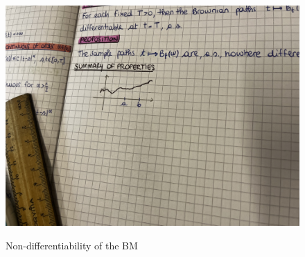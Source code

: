 \begin{figure}
    \begin{center}
    \includegraphics[width=14cm]{IMG_9589.jpeg}\\ 
    \caption{Non-differentiability of the BM} 
    \label{fig_1}
    \end{center} 
\end{figure} 

